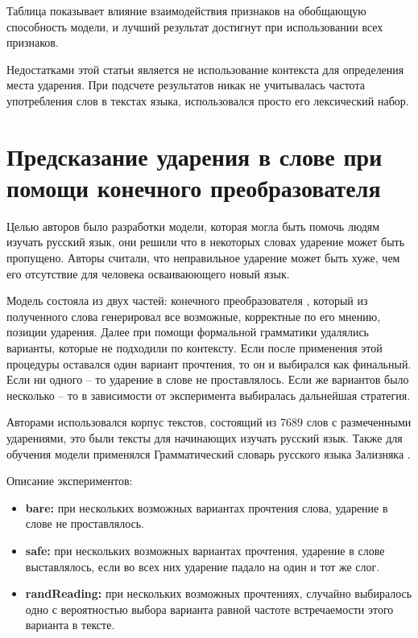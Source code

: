 \documentclass[14pt, a4paper, russian]{report}
\begin{document}
\begin{normalsize}
\begin{table}[H]
\begin{small}
\begin{center}
\begin{tabular}{|c|c|}
			\end{tabular}
		\end{center}
	\end{small}
	\label{table:range_res}
\end{table}

Таблица показывает  влияние взаимодействия признаков на обобщающую способность модели, и лучший результат достигнут при использовании всех признаков.

Недостатками этой статьи является не использование контекста для определения места ударения. При подсчете результатов никак не учитывалась частота употребления слов в текстах языка, использовался просто его лексический набор.

\section{Предсказание ударения в слове при помощи конечного преобразователя}

Целью авторов\cite{reynolds} было разработки модели, которая могла быть помочь людям изучать русский язык, они решили что в некоторых словах ударение может быть пропущено. Авторы считали, что неправильное ударение может быть хуже, чем его отсутствие для человека осваиваюющего новый язык.

Модель состояла из двух частей: конечного преобразователя \cite{koskenniemi, karttunen}, который из полученного слова генерировал все возможные, корректные по его мнению, позиции ударения. Далее при помощи формальной грамматики \cite{karlsson} удалялись варианты, которые не подходили по контексту. Если после применения этой процедуры оставался один вариант прочтения, то он и выбирался как финальный. Если ни одного -- то ударение в слове не проставлялось. Если же вариантов было несколько -- то в зависимости от эксперимента выбиралась дальнейшая стратегия. 

Авторами использовался корпус текстов, состоящий из 7689 слов с размеченными ударениями, это были тексты для начинающих изучать русский язык. Также для обучения модели применялся Грамматический словарь русского языка Зализняка \cite{zaliz}. 

Описание экспериментов:
\begin{itemize}
	\item \textbf{bare:} при нескольких возможных вариантах прочтения  слова, ударение в слове не проставлялось.
	\item \textbf{safe:}  при нескольких возможных вариантах прочтения, ударение в слове выставлялось, если во всех них ударение падало на один и тот же слог.
	\item \textbf{randReading:} при нескольких возможных прочтениях, случайно выбиралось одно с вероятностью выбора варианта равной частоте встречаемости этого варианта в тексте.
	

\end{itemize}
\end{normalsize}
\end{document}
